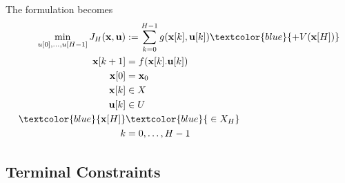 The formulation becomes
\begin{align*}
    \min_{u[0], \ldots, u[H-1]} J_{H}(\mathbf{x,u}) & := \sum_{k=0}^{H-1}g(\mathbf{x}[k],\mathbf{u}[k]) \textcolor{blue}{+V(\textbf{x}[H])} \\
    \mathbf{x}[k+1]                                 & = f(\mathbf{x}[k]. \mathbf{u}[k])                                                     \\
    \mathbf{x}[0]                                   & = \mathbf{x}_0                                                                        \\
    \mathbf{x}[k]                                   & \in X                                                                                 \\
    \mathbf{u}[k]                                   & \in U                                                                                 \\
    \textcolor{blue}{\mathbf{x}[H]}                 & \textcolor{blue}{\;\in X_H}                                                           \\
    k                                               & = 0,\ldots,H-1
\end{align*}

\subsection{Terminal Constraints}

